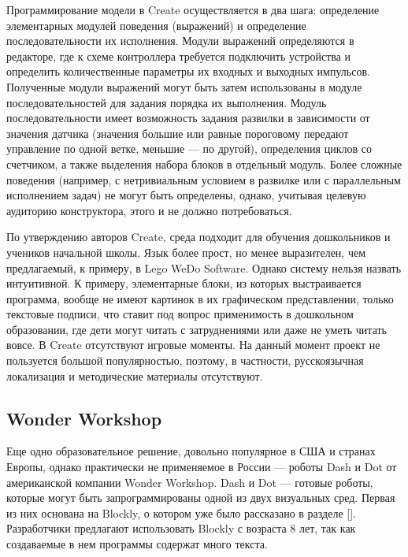 \documentclass[a5paper]{article}
\begin{document}
Программирование модели в Create осуществляется в два шага: определение элементарных модулей поведения (выражений) 
и определение последовательности  их исполнения. Модули выражений определяются в редакторе, где к схеме контроллера 
требуется подключить устройства и определить количественные параметры их входных и выходных импульсов. Полученные 
модули выражений могут быть затем использованы в модуле последовательностей для задания порядка их выполнения. 
Модуль последовательности имеет возможность задания развилки в зависимости от значения датчика (значения большие 
или равные пороговому передают управление по одной ветке, меньшие --- по другой), определения циклов со счетчиком, 
а также выделения набора блоков в отдельный модуль. Более сложные поведения (например, с нетривиальным условием в 
развилке или с параллельным исполнением задач) не могут быть определены, однако, учитывая целевую аудиторию 
конструктора, этого и не должно потребоваться.

По утверждению авторов Create, среда подходит для обучения дошкольников и учеников начальной школы. Язык более прост, 
но менее выразителен, чем предлагаемый, к примеру, в Lego WeDo Software. Однако систему нельзя назвать интуитивной. 
К примеру, элементарные блоки, из которых выстраивается программа, вообще не имеют картинок в их графическом 
представлении, только текстовые подписи, что ставит под вопрос применимость в дошкольном образовании, где дети могут 
читать с затруднениями или даже не уметь читать вовсе. В Create отсутствуют игровые моменты. На данный момент проект 
не пользуется большой популярностью, поэтому, в частности, русскоязычная локализация и методические материалы 
отсутствуют.

\subsection{Wonder Workshop}

Еще одно образовательное решение, довольно популярное в США и странах Европы, однако практически не применяемое в 
России --- роботы Dash и Dot от американской компании Wonder Workshop. Dash и Dot --- готовые роботы, которые 
могут быть запрограммированы одной из двух визуальных сред. Первая из них основана на Blockly, о котором уже 
было рассказано в разделе []. Разработчики предлагают использовать Blockly с возраста 8 лет, так как создаваемые 
в нем программы содержат много текста. 
\end{document}
